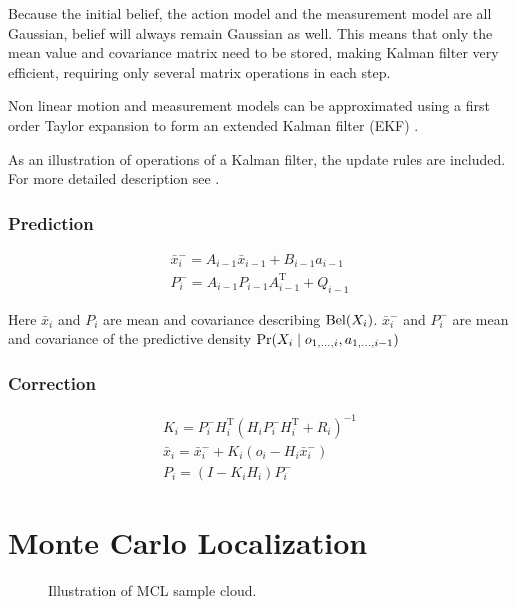 Because the initial belief, the action model and the measurement model are all Gaussian,
belief will always remain Gaussian as well.
This means that only the mean value and covariance matrix need to be stored, making
Kalman filter very efficient, requiring only several matrix operations in each step.

Non linear motion and measurement models can be approximated
using a first order Taylor expansion to form an extended Kalman
filter (EKF) \cite{welch95}.

As an illustration of operations of a Kalman filter, the update rules are included.
For more detailed description see \cite{welch95}.

\subsubsection{Prediction}
\begin{gather}
	\bar{x}^{-}_i = A_{i - 1}\bar{x}_{i-1} + B_{i - 1}a_{i - 1}
	\\
	P^{-}_i = A_{i - 1}P_{i - 1}A^{\mathrm{T}}_{i - 1} + Q_{i - 1}
\end{gather}

Here \(\bar{x}_i\) and \(P_i\) are mean and covariance describing \(\operatorname{\mathrm{Bel}}(X_i)\).
\(\bar{x}^{-}_i\) and \(P^{-}_i\) are mean and covariance of the predictive density
\(\operatorname{\mathrm{Pr}}(X_i \mid o_{1, \dotsc, i}, a_{1, \dotsc, i - 1})\)

\subsubsection{Correction}
\begin{gather}
	\label{eq:kalman-gain}
	K_i = P^{-}_{i}H^{\mathrm{T}}_{i}(H_{i}P^{-}_{i}H^{\mathrm{T}}_{i} + R_{i})^{-1}
	\\
	\bar{x}_i = \bar{x}^{-}_i + K_i (o_i - H_{i}\bar{x}^{-}_i)
	\\
	P_i = (I - K_{i}H_{i})P^{-}_i
\end{gather}


\section{Monte Carlo Localization}
\label{sec:mcl-algorithm}

\begin{figure}[tp]
	\centering
	
	\caption{Illustration of MCL sample cloud.}
	\label{fig:mcl}
\end{figure}

